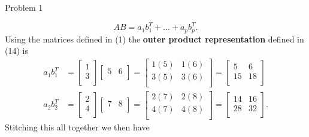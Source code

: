 \begin{problem}{Problem 1}
\begin{Highlight}[Solution]
        \begin{equation}
            AB = a_{1}b_{1}^{T} + \dots + a_{p}b_{p}^{T}.
        \end{equation}
        Using the matrices defined in (1) the \textbf{outer product representation} defined in (14) is 
        \begin{align*}
            a_{1}b_{1}^{T} & = 
            \begin{bmatrix}
                1 \\
                3 \\
            \end{bmatrix}
            \begin{bmatrix}
                5 & 6 \\
            \end{bmatrix}
            = 
            \begin{bmatrix}
                1(5) & 1(6) \\
                3(5) & 3(6) \\
            \end{bmatrix}
            = 
            \begin{bmatrix}
                5 & 6 \\
                15 & 18 \\
            \end{bmatrix} \\
            a_{2}b_{2}^{T} & = 
            \begin{bmatrix}
                2 \\
                4 \\
            \end{bmatrix}
            \begin{bmatrix}
                7 & 8 \\
            \end{bmatrix}
            = 
            \begin{bmatrix}
                2(7) & 2(8) \\
                4(7) & 4(8) \\
            \end{bmatrix}
            = 
            \begin{bmatrix}
                14 & 16 \\
                28 & 32 \\
            \end{bmatrix}.
        \end{align*}
        Stitching this all together we then have 


\end{Highlight}
\end{problem}
